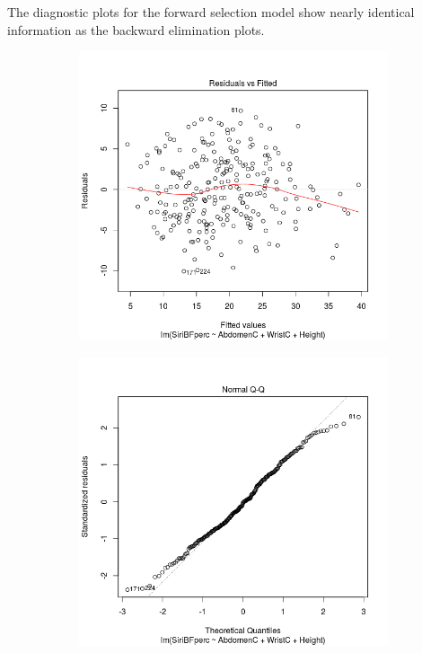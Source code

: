 \documentclass[a4paper, 11pt]{article}
\begin{document}
The diagnostic plots for the forward selection model show nearly identical information as the backward elimination plots.

\begin{figure}[H]
  \begin{subfigure}[t]{.5\textwidth}
    \centering
    \includegraphics[width=\linewidth]{fwd_resid.png}
  \end{subfigure}
  \hfill
  \begin{subfigure}[t]{.5\textwidth}
    \centering
    \includegraphics[width=\linewidth]{fwd_qq.png}

\end{subfigure}
\end{figure}
\end{document}
